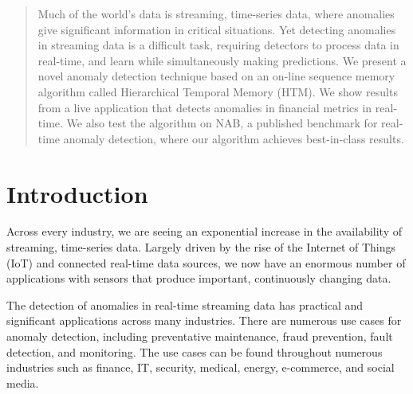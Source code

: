\documentclass{article}
\begin{document}
 


\begin{abstract} 
Much of the world’s data is streaming, time-series data, where anomalies give
significant information in critical situations. Yet detecting anomalies in
streaming data is a difficult task, requiring detectors to process data in
real-time, and learn while simultaneously making predictions. We present a novel
anomaly detection technique based on an on-line sequence memory algorithm called
Hierarchical Temporal Memory (HTM). We show results from a live
application that detects anomalies in financial metrics in real-time. We also
test the algorithm on NAB, a published benchmark for real-time anomaly
detection, where our algorithm achieves best-in-class results.
\end{abstract} 

\section{Introduction}
\label{introduction}

Across every industry, we are seeing an exponential increase in
the availability of streaming, time-series data. Largely driven by the rise of
the Internet of Things (IoT) and connected real-time data sources, we now have
an enormous number of applications with sensors that produce important,
continuously changing data.

The detection of anomalies in real-time streaming data has practical and
significant applications across many industries.  There are numerous use cases
for anomaly detection, including preventative maintenance, fraud prevention,
fault detection, and monitoring. The use cases can be found throughout numerous
industries such as finance, IT, security, medical, energy, e-commerce, and
social media.
\end{document}
